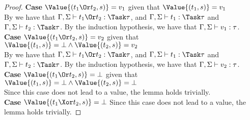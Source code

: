 \begin{proof}
  \noindent\textbf{Case} $\Value{(t_1\Or t_2,s)}=v_1$ given that
  $\Value{(t_1,s)}=v_1$\\
  By  we have that $\Gamma,\Sigma\infers t_1\Or t_2:\Task\tau$,
  and $\Gamma,\Sigma\infers t_1:\Task\tau$ and
  $\Gamma,\Sigma\infers t_2:\Task\tau$. By the induction hypothesis, we have
  that $\Gamma,\Sigma\vdash v_1:\tau$.\\

  \noindent\textbf{Case} $\Value{(t_1\Or t_2,s)}=v_2$ given that
  $\Value{(t_1,s)}=\bot\wedge\Value{(t_2,s)}=v_2$\\
  By  we have that $\Gamma,\Sigma\infers t_1\Or t_2:\Task\tau$,
  and $\Gamma,\Sigma\infers t_1:\Task\tau$ and
  $\Gamma,\Sigma\infers t_2:\Task\tau$. By the induction hypothesis, we have
  that $\Gamma,\Sigma\vdash v_2:\tau$.\\

  \noindent\textbf{Case} $\Value{(t_1\Or t_2,s)}=\bot$ given that
  $\Value{(t_1,s)}=\bot\wedge\Value{(t_2,s)}=\bot$\\ Since this case does not
  lead to a value, the lemma holds trivially.\\

  \noindent\textbf{Case} $\Value{(t_1\Xor t_2,s)}=\bot$ Since this case does not
  lead to a value, the lemma holds trivially.

\end{proof}



